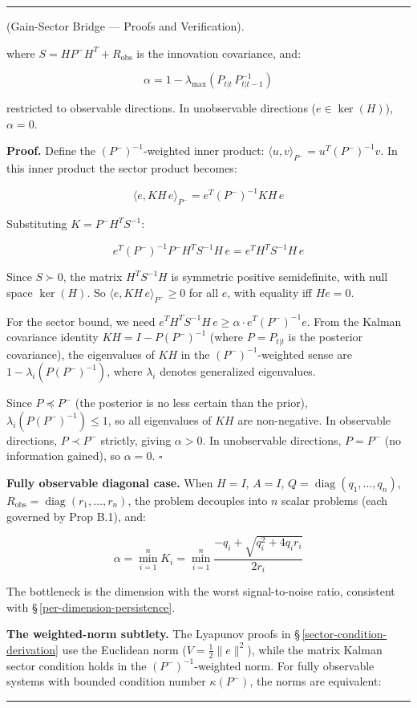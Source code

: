 \documentclass[11pt,oneside]{article}
\newcounter{claim}[section]
\renewcommand{\theclaim}{\thesection.\arabic{claim}}
\newenvironment{segment}[2]{%
  \refstepcounter{claim}%
  \bigskip\noindent\hrule\smallskip
  \noindent{\bfseries #1~\theclaim}\enskip(#2).\par\smallskip
  \noindent\ignorespaces
}{%
  \par\smallskip\noindent\hrule\bigskip
}
\newenvironment{derivation}[1][]{\begin{segment}{Derivation}{#1}}{\end{segment}}
\begin{document}
\begin{derivation}[Gain-Sector Bridge — Proofs and Verification]
where $S = H P^- H^T + R_{\text{obs}}$ is the innovation covariance, and:

$$\alpha = 1 - \lambda_{\max}(P_{t\vert t} \, P_{t\vert t-1}^{-1})$$

restricted to observable directions. In unobservable directions ($e \in \ker(H)$), $\alpha = 0$.

\textbf{Proof.} Define the $(P^-)^{-1}$-weighted inner product: $\langle u, v \rangle_{P^-} = u^T (P^-)^{-1} v$. In this inner product the sector product becomes:

$$\langle e, KH \, e \rangle_{P^-} = e^T (P^-)^{-1} KH \, e$$

Substituting $K = P^- H^T S^{-1}$:

$$e^T (P^-)^{-1} P^- H^T S^{-1} H \, e = e^T H^T S^{-1} H \, e$$

Since $S \succ 0$, the matrix $H^T S^{-1} H$ is symmetric positive semidefinite, with null space $\ker(H)$. So $\langle e, KH \, e \rangle_{P^-} \geq 0$ for all $e$, with equality iff $He = 0$.

For the sector bound, we need $e^T H^T S^{-1} H \, e \geq \alpha \cdot e^T (P^-)^{-1} e$. From the Kalman covariance identity $KH = I - P (P^-)^{-1}$ (where $P = P_{t\vert t}$ is the posterior covariance), the eigenvalues of $KH$ in the $(P^-)^{-1}$-weighted sense are $1 - \lambda_i(P(P^-)^{-1})$, where $\lambda_i$ denotes generalized eigenvalues.

Since $P \preceq P^-$ (the posterior is no less certain than the prior), $\lambda_i(P(P^-)^{-1}) \leq 1$, so all eigenvalues of $KH$ are non-negative. In observable directions, $P \prec P^-$ strictly, giving $\alpha > 0$. In unobservable directions, $P = P^-$ (no information gained), so $\alpha = 0$. $\square$

\textbf{Fully observable diagonal case.} When $H = I$, $A = I$, $Q = \operatorname{diag}(q_1, \ldots, q_n)$, $R_{\text{obs}} = \operatorname{diag}(r_1, \ldots, r_n)$, the problem decouples into $n$ scalar problems (each governed by Prop B.1), and:


$$\alpha = \min_{i=1}^n K_i = \min_{i=1}^n \frac{-q_i + \sqrt{q_i^2 + 4 q_i r_i}}{2 r_i}$$

The bottleneck is the dimension with the worst signal-to-noise ratio, consistent with \S\,\ref{per-dimension-persistence}.

\textbf{The weighted-norm subtlety.} The Lyapunov proofs in \S\,\ref{sector-condition-derivation} use the Euclidean norm ($V = \frac{1}{2}\lVert e\rVert^2$), while the matrix Kalman sector condition holds in the $(P^-)^{-1}$-weighted norm. For fully observable systems with bounded condition number $\kappa(P^-)$, the norms are equivalent:


\end{derivation}
\end{document}
